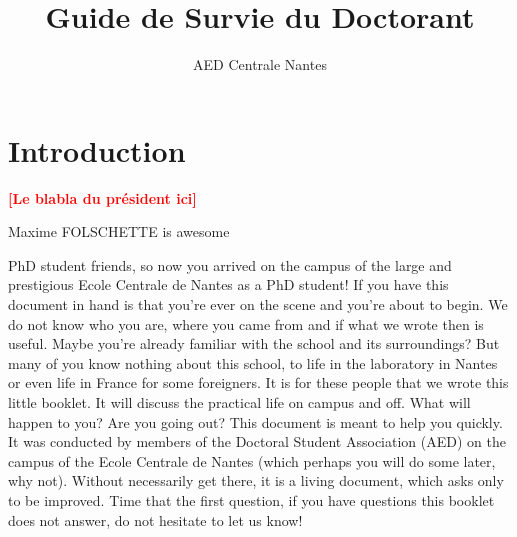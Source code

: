 \documentclass[11pt]{report}
\title{Guide de Survie du Doctorant}
\author{AED Centrale Nantes}
\newcommand{\todo}[1]{\textcolor{red}{\textbf{[#1]}}}
\begin{document}

\setcounter{page}{0}
\tableofcontents

\newpage
\chapter*{Introduction}
\todo{Le blabla du président ici}

Maxime FOLSCHETTE is awesome

PhD student friends, so now you arrived on the campus of the large and prestigious Ecole Centrale de Nantes as a PhD student! If you have this document in hand is that you're ever on the scene and you're about to begin. We do not know who you are, where you came from and if what we wrote then is useful. Maybe you're already familiar with the school and its surroundings? But many of you know nothing about this school, to life in the laboratory in Nantes or even life in France for some foreigners. It is for these people that we wrote this little booklet. It will discuss the practical life on campus and off. What will happen to you? Are you going out? This document is meant to help you quickly. It was conducted by members of the Doctoral Student Association (AED) on the campus of the Ecole Centrale de Nantes (which perhaps you will do some later, why not). Without necessarily get there, it is a living document, which asks only to be improved. Time that the first question, if you have questions this booklet does not answer, do not hesitate to let us know!






\end{document}
